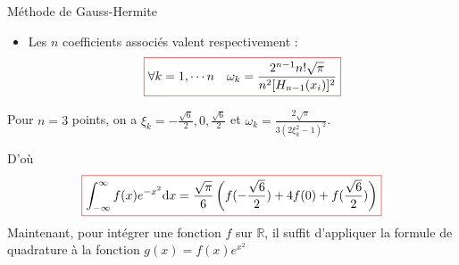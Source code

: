 \documentclass{beamer}
\def \de {{\rm d}}
\newcommand{\myredbox}[1]{\fcolorbox{red}{white}{$\displaystyle#1$}}
\begin{document}
\begin{frame}
\begin{block}{Méthode de Gauss-Hermite}
\begin{itemize}
\item Les $n$ coefficients associés valent respectivement :
\[\myredbox{\forall k =1,\cdots n\quad \omega_k={\frac  {2^{{n-1}}n!{\sqrt  {\pi }}}{n^2[H_{n-1}(x_{i})]^{2}}} }\]

\end{itemize}

Pour $n=3$ points, on a $\xi_k=-\frac{\sqrt{6}}{2},0,\frac{\sqrt{6}}{2}$ et $\omega_k=\frac{2\sqrt{\pi}}{3(2\xi_k^2-1)^2}$.

D'où
\[\myredbox{\int_{-\infty}^{\infty}f(x)e^{-x^2}\de x =\frac{\sqrt{\pi}}{6}\left(f( -\frac{\sqrt{6}}{2}) +4f(0)+f(\frac{\sqrt{6}}{2})\right) }\]
Maintenant, pour intégrer une fonction $f$ sur $\mathbb{R}$, il suffit d'appliquer la formule de quadrature à la fonction  $g(x)=f(x)e^{x^2}$
\end{block}
\end{frame}

  
\end{document}
